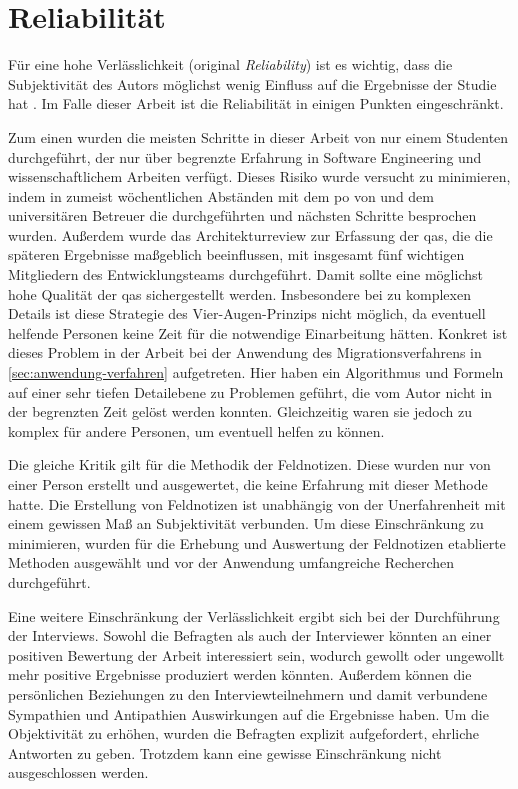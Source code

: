 \section{Reliabilität}

Für eine hohe Verlässlichkeit (original \emph{Reliability}) ist es wichtig, dass die Subjektivität des Autors möglichst wenig Einfluss auf die Ergebnisse der Studie hat \cite{Runeson2009}.
Im Falle dieser Arbeit ist die Reliabilität in einigen Punkten eingeschränkt.

Zum einen wurden die meisten Schritte in dieser Arbeit von nur einem Studenten durchgeführt, der nur über begrenzte Erfahrung in Software Engineering und wissenschaftlichem Arbeiten verfügt.
Dieses Risiko wurde versucht zu minimieren, indem in zumeist wöchentlichen Abständen mit dem \gls{po} von \jf und dem universitären Betreuer die durchgeführten und nächsten Schritte besprochen wurden.
Außerdem wurde das Architekturreview zur Erfassung der \glspl{qa}, die die späteren Ergebnisse maßgeblich beeinflussen, mit insgesamt fünf wichtigen Mitgliedern des Entwicklungsteams durchgeführt.
Damit sollte eine möglichst hohe Qualität der \glspl{qa} sichergestellt werden.
Insbesondere bei zu komplexen Details ist diese Strategie des Vier-Augen-Prinzips nicht möglich, da eventuell helfende Personen keine Zeit für die notwendige Einarbeitung hätten.
Konkret ist dieses Problem in der Arbeit bei der Anwendung des Migrationsverfahrens in \cref{sec:anwendung-verfahren} aufgetreten.
Hier haben ein Algorithmus und Formeln auf einer sehr tiefen Detailebene zu Problemen geführt, die vom Autor nicht in der begrenzten Zeit gelöst werden konnten.
Gleichzeitig waren sie jedoch zu komplex für andere Personen, um eventuell helfen zu können.

Die gleiche Kritik gilt für die Methodik der Feldnotizen.
Diese wurden nur von einer Person erstellt und ausgewertet, die keine Erfahrung mit dieser Methode hatte.
Die Erstellung von Feldnotizen ist unabhängig von der Unerfahrenheit mit einem gewissen Maß an Subjektivität verbunden.
Um diese Einschränkung zu minimieren, wurden für die Erhebung und Auswertung der Feldnotizen etablierte Methoden ausgewählt und vor der Anwendung umfangreiche Recherchen durchgeführt.

Eine weitere Einschränkung der Verlässlichkeit ergibt sich bei der Durchführung der Interviews.
Sowohl die Befragten als auch der Interviewer könnten an einer positiven Bewertung der Arbeit interessiert sein, wodurch gewollt oder ungewollt mehr positive Ergebnisse produziert werden könnten.
Außerdem können die persönlichen Beziehungen zu den Interviewteilnehmern und damit verbundene Sympathien und Antipathien Auswirkungen auf die Ergebnisse haben.
Um die Objektivität zu erhöhen, wurden die Befragten explizit aufgefordert, ehrliche Antworten zu geben.
Trotzdem kann eine gewisse Einschränkung nicht ausgeschlossen werden.


